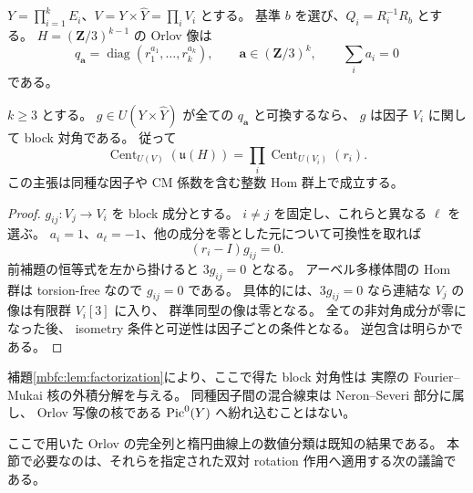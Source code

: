 $Y=\prod_{i=1}^kE_i$、$V=Y\times\widehat Y=\prod_iV_i$ とする。
基準 $b$ を選び、$Q_i=R_i^{-1}R_b$ とする。
$H=(\mathbf Z/3)^{k-1}$ の Orlov 像は
\[
 q_{\mathbf a}=\operatorname{diag}(r_1^{a_1},\ldots,r_k^{a_k}),
 \qquad
 \mathbf a\in(\mathbf Z/3)^k,\qquad \sum_i a_i=0
\]
である。

\begin{lemma}
\label{mbfc:lem:marked-block-rigidity}
$k\ge3$ とする。
$g\in U(Y\times\widehat Y)$ が全ての $q_{\mathbf a}$ と可換するなら、
$g$ は因子 $V_i$ に関して block 対角である。
従って
\[
 \operatorname{Cent}_{U(V)}(\mathfrak u(H))
   =\prod_i\operatorname{Cent}_{U(V_i)}(r_i).
\]
この主張は同種な因子や CM 係数を含む整数 Hom 群上で成立する。
\end{lemma}
\begin{proof}
$g_{ij}:V_j\to V_i$ を block 成分とする。
$i\ne j$ を固定し、これらと異なる $\ell$ を選ぶ。
$a_i=1$、$a_\ell=-1$、他の成分を零とした元について可換性を取れば
\[
 (r_i-I)g_{ij}=0.
\]
前補題の恒等式を左から掛けると $3g_{ij}=0$ となる。
アーベル多様体間の Hom 群は torsion-free なので $g_{ij}=0$ である。
具体的には、$3g_{ij}=0$ なら連結な $V_j$ の像は有限群 $V_i[3]$ に入り、
群準同型の像は零となる。
全ての非対角成分が零になった後、
isometry 条件と可逆性は因子ごとの条件となる。
逆包含は明らかである。
\end{proof}

補題\ref{mbfc:lem:factorization}により、ここで得た block 対角性は
実際の Fourier--Mukai 核の外積分解を与える。
同種因子間の混合線束は Neron--Severi 部分に属し、
Orlov 写像の核である $\operatorname{Pic}^0(Y)$ へ紛れ込むことはない。

ここで用いた Orlov の完全列と楕円曲線上の数値分類は既知の結果である。
本節で必要なのは、それらを指定された双対 rotation 作用へ適用する次の議論である。

